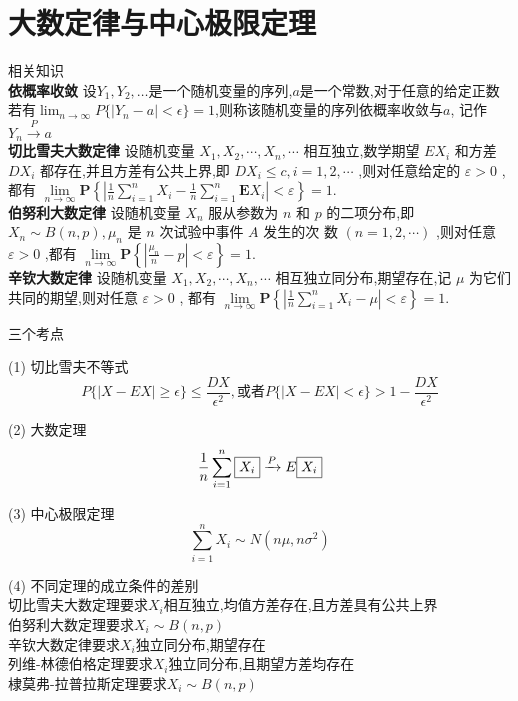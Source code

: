 \documentclass[12pt, a4paper, oneside, UTF8]{ctexbook}
\begin{document}
% 
\else
\fi

\chapter{大数定律与中心极限定理}
\begin{remark}
    相关知识 \\
    \textbf{依概率收敛} 设$Y_1,Y_2,\ldots$是一个随机变量的序列,$a$是一个常数,对于任意的给定正数
    若有$\lim_{n\to\infty}P\{\left|Y_n-a\right|<\epsilon\}=1$,则称该随机变量的序列依概率收敛与$a$,
    记作$Y_n\xrightarrow{P}a$ \\
    \textbf{切比雪夫大数定律}
    设随机变量 ${X}_{1},{X}_{2},\cdots ,{X}_{n},\cdots$ 相互独立,数学期望 $E{X}_{i}$ 和方差 $D{X}_{i}$ 都存在,并且方差有公共上界,即
    $D{X}_{i} \leq  c,i = 1,2,\cdots$ ,则对任意给定的 $\varepsilon  > 0$ ,都有
    $\mathop{\lim }\limits_{{n \rightarrow  \infty }}\mathbf{P}\left\{  {\left| {\frac{1}{n}\mathop{\sum }\limits_{{i = 1}}^{n}{X}_{i} - \frac{1}{n}\mathop{\sum }\limits_{{i = 1}}^{n}\mathbf{E}{X}_{i}}\right|  < \varepsilon }\right\}   = 1.$ \\
    \textbf{伯努利大数定律}
    设随机变量 ${X}_{n}$ 服从参数为 $n$ 和 $p$ 的二项分布,即 ${X}_{n} \sim  B\left( {n,p}\right) ,{\mu }_{n}$ 是 $n$ 次试验中事件 $A$ 发生的次
    数 $\left( {n = 1,2,\cdots }\right)$ ,则对任意 $\varepsilon  > 0$ ,都有
    $\mathop{\lim }\limits_{{n \rightarrow  \infty }}\mathbf{P}\left\{  {\left| {\frac{{\mu }_{n}}{n} - p}\right|  < \varepsilon }\right\}   = 1.$ \\
    \textbf{辛钦大数定律}
    设随机变量 ${X}_{1},{X}_{2},\cdots ,{X}_{n},\cdots$ 相互独立同分布,期望存在,记 $\mu$ 为它们共同的期望,则对任意 $\varepsilon  > 0$ ,
    都有
    $\mathop{\lim }\limits_{{n \rightarrow  \infty }}\mathbf{P}\left\{  {\left| {\frac{1}{n}\mathop{\sum }\limits_{{i = 1}}^{n}{X}_{i} - \mu }\right|  < \varepsilon }\right\}   = 1.$
\end{remark}
\begin{remark}
    三个考点
    \item[(1)] 切比雪夫不等式 
    \[
    P\{\left|X-EX\right|\geq\epsilon\}\leq \frac{DX}{\epsilon^2},
    \text{或者}P\{\left|X-EX\right| < \epsilon\}>1-\frac{DX}{\epsilon^2}
    \]
    \item[(2)] 大数定理 
    \[
    \frac{1}{n}\sum_{i=1}^{n}\fbox{$X_i$}\xrightarrow{P}E\fbox{$X_i$}
    \]
    \item[(3)] 中心极限定理
    \[
    \sum_{i=1}^{n}X_i\sim N(n\mu,n\sigma^2)
    \]
    \item[(4)]不同定理的成立条件的差别  \\
    切比雪夫大数定理要求$X_i$相互独立,均值方差存在,且方差具有公共上界 \\
    伯努利大数定理要求$X_i\sim B(n,p)$ \\
    辛钦大数定律要求$X_i$独立同分布,期望存在 \\
    列维-林德伯格定理要求$X_i$独立同分布,且期望方差均存在 \\
    棣莫弗-拉普拉斯定理要求$X_i\sim B(n,p)$
\end{remark}
\end{document}
